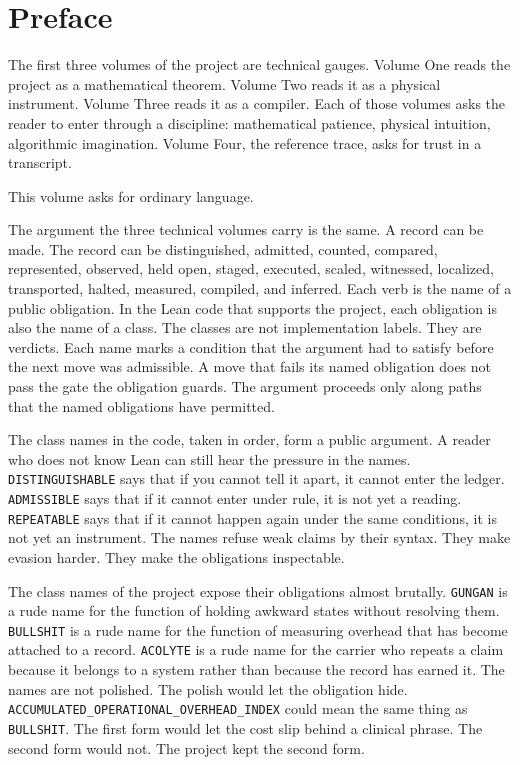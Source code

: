 \chapter*{Preface}
\label{chap:preface}

The first three volumes of the project are technical gauges. Volume One
reads the project as a mathematical theorem. Volume Two reads it as a
physical instrument. Volume Three reads it as a compiler. Each of those
volumes asks the reader to enter through a discipline: mathematical
patience, physical intuition, algorithmic imagination. Volume Four, the
reference trace, asks for trust in a transcript.

This volume asks for ordinary language.

The argument the three technical volumes carry is the same. A record can
be made. The record can be distinguished, admitted, counted, compared,
represented, observed, held open, staged, executed, scaled, witnessed,
localized, transported, halted, measured, compiled, and inferred. Each
verb is the name of a public obligation. In the Lean code that supports
the project, each obligation is also the name of a class. The classes
are not implementation labels. They are verdicts. Each name marks a
condition that the argument had to satisfy before the next move was
admissible. A move that fails its named obligation does not pass the
gate the obligation guards. The argument proceeds only along paths that
the named obligations have permitted.

The class names in the code, taken in order, form a public argument. A
reader who does not know Lean can still hear the pressure in the names.
\texttt{DISTINGUISHABLE} says that if you cannot tell it apart, it
cannot enter the ledger. \texttt{ADMISSIBLE} says that if it cannot
enter under rule, it is not yet a reading. \texttt{REPEATABLE} says
that if it cannot happen again under the same conditions, it is not yet
an instrument. The names refuse weak claims by their syntax. They make
evasion harder. They make the obligations inspectable.

The class names of the project expose their obligations almost
brutally. \texttt{GUNGAN} is a rude name for the function of holding
awkward states without resolving them. \texttt{BULLSHIT} is a rude name
for the function of measuring overhead that has become attached to a
record. \texttt{ACOLYTE} is a rude name for the carrier who repeats a
claim because it belongs to a system rather than because the record has
earned it. The names are not polished. The polish would let the
obligation hide. \texttt{ACCUMULATED\_OPERATIONAL\_OVERHEAD\_INDEX}
could mean the same thing as \texttt{BULLSHIT}. The first form would
let the cost slip behind a clinical phrase. The second form would not.
The project kept the second form.

